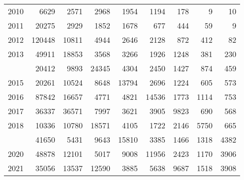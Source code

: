 \documentclass[
]{article}
\begin{document}
\begin{longtable}[t]{lrrrrrrrr}
2010 & 6629 & 2571 & 2968 & 1954 & 1194 & 178 & 9 & 10\\
2011 & 20275 & 2929 & 1852 & 1678 & 677 & 444 & 59 & 9\\
2012 & 120448 & 10811 & 4944 & 2646 & 2128 & 872 & 412 & 82\\
2013 & 49911 & 18853 & 3568 & 3266 & 1926 & 1248 & 381 & 230\\
\addlinespace
2014 & 20412 & 9893 & 24345 & 4304 & 2450 & 1427 & 874 & 459\\
2015 & 20261 & 10524 & 8648 & 13794 & 2696 & 1224 & 605 & 573\\
2016 & 87842 & 16657 & 4771 & 4821 & 14536 & 1773 & 1114 & 753\\
2017 & 36337 & 36571 & 7997 & 3621 & 3905 & 9823 & 690 & 568\\
2018 & 10336 & 10780 & 18571 & 4105 & 1722 & 2146 & 5750 & 665\\
\addlinespace
2019 & 41650 & 5431 & 9643 & 15810 & 3385 & 1466 & 1318 & 4382\\
2020 & 48878 & 12101 & 5017 & 9008 & 11956 & 2423 & 1170 & 3906\\
2021 & 35056 & 13537 & 12590 & 3885 & 5638 & 9687 & 1518 & 3908\\*
\end{longtable}
\end{document}

